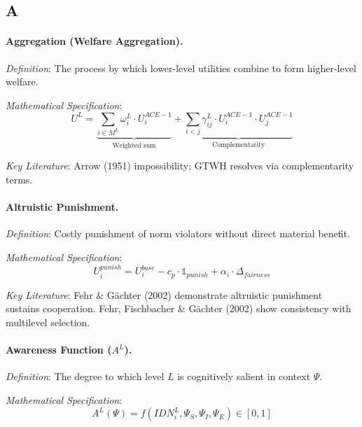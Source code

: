 \subsection*{A}

\paragraph{Aggregation (Welfare Aggregation).}
\textit{Definition}: The process by which lower-level utilities combine to form 
higher-level welfare.

\textit{Mathematical Specification}:
\begin{equation}
U^L = \underbrace{\sum_{i \in M^L} \omega^L_i \cdot U^{ACE-1}_i}_{\text{Weighted sum}} + 
\underbrace{\sum_{i < j} \gamma^L_{ij} \cdot U^{ACE-1}_i \cdot U^{ACE-1}_j}_{\text{Complementarity}}
\end{equation}

\textit{Key Literature}: Arrow (1951) impossibility; GTWH resolves via 
complementarity terms.

\medskip

\paragraph{Altruistic Punishment.}
\textit{Definition}: Costly punishment of norm violators without direct material benefit.

\textit{Mathematical Specification}:
\begin{equation}
U_i^{punish} = U_i^{base} - c_p \cdot \mathbb{1}_{punish} + \alpha_i \cdot \Delta_{fairness}
\end{equation}

\textit{Key Literature}: Fehr \& Gächter (2002) demonstrate altruistic punishment 
sustains cooperation. Fehr, Fischbacher \& Gächter (2002) show consistency with 
multilevel selection.

\medskip

\paragraph{Awareness Function ($A^L$).}
\textit{Definition}: The degree to which level $L$ is cognitively salient in context $\Psi$.

\textit{Mathematical Specification}:
\begin{equation}
A^L(\Psi) = f\left( IDN^L_i, \Psi_S, \Psi_I, \Psi_E \right) \in [0, 1]
\end{equation}

